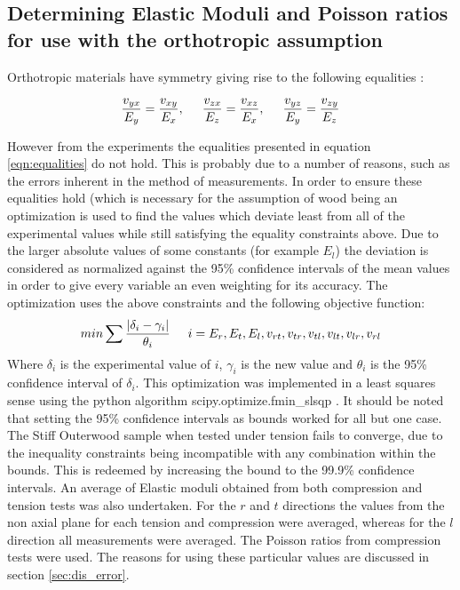 \documentclass[10pt]{article}
\begin{document}
\subsection{Determining Elastic Moduli and Poisson ratios for use with the orthotropic assumption}
\label{sec:orthotropic_assumption}
Orthotropic materials have symmetry giving rise to the following equalities \citep{salencon_handbook_2001}:

\begin{equation}\label{eqn:equalities}
\frac{v_{yx}}{E_y}=\frac{v_{xy}}{E_x},\hspace{0.5cm} \frac{v_{zx}}{E_z}=\frac{v_{xz}}{E_x},\hspace{0.5cm} \frac{v_{yz}}{E_y}=\frac{v_{zy}}{E_z}
\end{equation}

However from the experiments the equalities presented in equation \ref{eqn:equalities} do not hold. This is probably due
to a number of reasons, such as the errors inherent in the method of measurements. In order to ensure these equalities hold (which is necessary for the assumption of wood being an
optimization is used to find the values which deviate least from all of the
experimental values while still satisfying the equality constraints above. Due to the larger absolute values of some constants (for example \(E_l\))
the deviation is considered as normalized against the 95\% confidence intervals of the mean values in order to give every
variable an even weighting for its accuracy. The optimization uses the above constraints and the following objective function:
\begin{equation}\label{eqn:min}
min\sum \frac{|\delta_i - \gamma_i|}{ \theta_i} \hspace{0.5cm} i = E_r, E_t, E_l, v_{rt}, v_{tr}, v_{tl}, v_{lt}, v_{lr}, v_{rl}
\end{equation}
Where \(\delta_i\) is the experimental value of \(i\), \(\gamma_i\) is the new value and \(\theta_i\) is the 95\% confidence
interval of \(\delta_i\). This optimization was implemented in a least squares sense using the  python algorithm
scipy.optimize.fmin\_slsqp \citep{jones_scipy:_2001}. It should be noted that setting the 95\% confidence intervals as bounds
worked for all but one case. The Stiff Outerwood sample when tested under tension fails to converge, due to the inequality
constraints being incompatible with any combination within the bounds. This is redeemed by increasing the bound to the 99.9\%
confidence intervals. An average of  Elastic moduli obtained from both compression and tension tests was also undertaken.
For the \(r\) and \(t\) directions the values from the non axial plane for each tension and compression were averaged,
whereas for the \(l\) direction all measurements were averaged. The Poisson ratios from compression tests were used.
The reasons for using these particular values are discussed in section \ref{sec:dis_error}.
\end{document}

